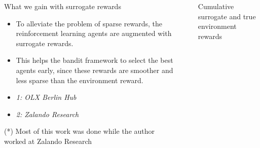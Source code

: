 \documentclass[final]{beamer}
\newlength{\sepwid}
\newlength{\onecolwid}
\begin{document}
\begin{frame}[t]
\begin{columns}[t]
\begin{column}{\onecolwid}
\begin{block}{What we gain with surrogate rewards}
\begin{itemize}
\item To alleviate the problem of sparse rewards, the reinforcement learning agents are augmented with surrogate rewards. 
\item This helps the bandit framework to select the best agents early, since these rewards are smoother and less sparse than the environment reward. 
\end{itemize}

\end{block}

\vspace*{-0.5cm}

\begin{footnotesize}
\begin{itemize}
\item \textit{1: OLX Berlin Hub}
\item \textit{2: Zalando Research}
\end{itemize}

(*) Most of this work was done while the author worked at Zalando Research

\end{footnotesize}


\end{column} %

\begin{column}{\sepwid}\end{column} %


\begin{column}{\onecolwid} %


\begin{block}{Cumulative surrogate and true environment rewards}

\begin{figure}[h!]


\end{figure}
\end{block}
\end{column}
\end{columns}
\end{frame}
\end{document}
